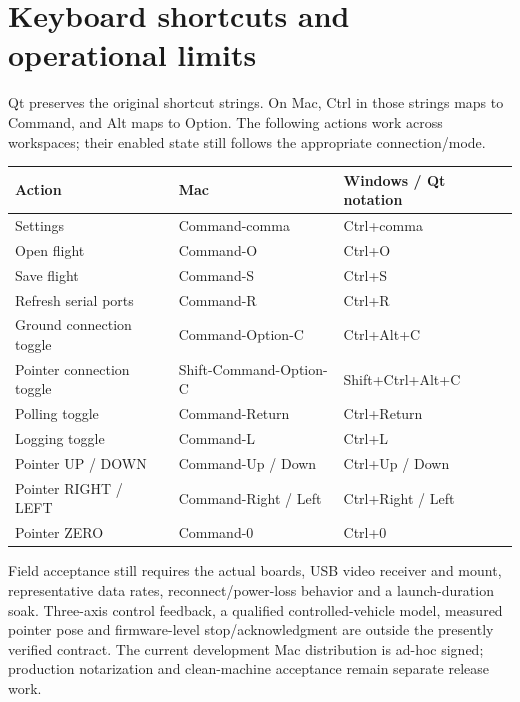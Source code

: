 \section{Keyboard shortcuts and operational limits}\label{sec:shortcuts}
Qt preserves the original shortcut strings. On Mac, Ctrl in those strings maps
to Command, and Alt maps to Option. The following actions work across workspaces;
their enabled state still follows the appropriate connection/mode.

\begin{longtable}{@{}L{.39\linewidth}L{.27\linewidth}L{.27\linewidth}@{}}
\toprule Action & Mac & Windows / Qt notation \\\midrule\endhead
Settings & Command-comma & Ctrl+comma \\
Open flight & Command-O & Ctrl+O \\
Save flight & Command-S & Ctrl+S \\
Refresh serial ports & Command-R & Ctrl+R \\
Ground connection toggle & Command-Option-C & Ctrl+Alt+C \\
Pointer connection toggle & Shift-Command-Option-C & Shift+Ctrl+Alt+C \\
Polling toggle & Command-Return & Ctrl+Return \\
Logging toggle & Command-L & Ctrl+L \\
Pointer UP / DOWN & Command-Up / Down & Ctrl+Up / Down \\
Pointer RIGHT / LEFT & Command-Right / Left & Ctrl+Right / Left \\
Pointer ZERO & Command-0 & Ctrl+0 \\
\bottomrule
\end{longtable}

Field acceptance still requires the actual boards, USB video receiver and mount,
representative data rates, reconnect/power-loss behavior and a launch-duration
soak. Three-axis control feedback, a qualified controlled-vehicle model, measured
pointer pose and firmware-level stop/acknowledgment are outside the presently
verified contract. The current development Mac distribution is ad-hoc signed;
production notarization and clean-machine acceptance remain separate release work.
